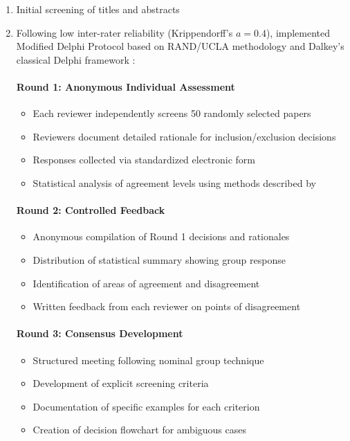 \documentclass[acmsmall]{acmart}
\begin{document}
\begin{enumerate}
    \item Initial screening of titles and abstracts
    \item Following low inter-rater reliability (Krippendorff's $a = 0.4$), implemented Modified Delphi Protocol based on RAND/UCLA methodology \citep{fitch2001rand} and Dalkey's classical Delphi framework \citep{dalkey1969delphi}:

          \paragraph{Round 1: Anonymous Individual Assessment}
          \begin{itemize}
              \item Each reviewer independently screens 50 randomly selected papers
              \item Reviewers document detailed rationale for inclusion/exclusion decisions
              \item Responses collected via standardized electronic form
              \item Statistical analysis of agreement levels using methods described by \citet{diamond2014results}
          \end{itemize}

          \paragraph{Round 2: Controlled Feedback}
          \begin{itemize}
              \item Anonymous compilation of Round 1 decisions and rationales
              \item Distribution of statistical summary showing group response
              \item Identification of areas of agreement and disagreement
              \item Written feedback from each reviewer on points of disagreement
          \end{itemize}

          \paragraph{Round 3: Consensus Development}
          \begin{itemize}
              \item Structured meeting following nominal group technique \citep{delbecq1975group}
              \item Development of explicit screening criteria
              \item Documentation of specific examples for each criterion
              \item Creation of decision flowchart for ambiguous cases
          \end{itemize}


\end{enumerate}
\end{document}

